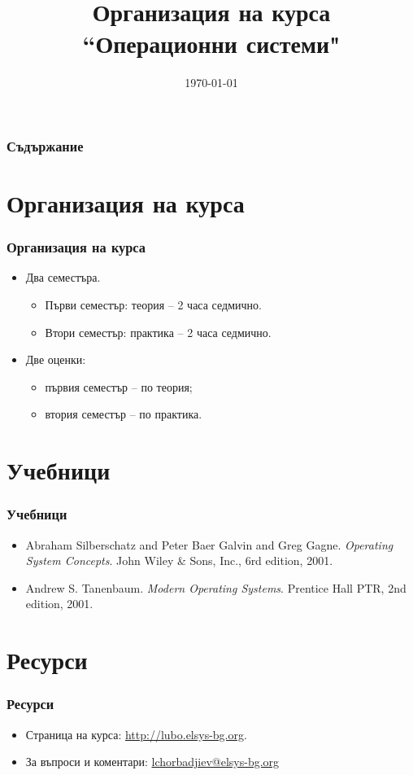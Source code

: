 \documentclass[ignorenonframetext, hyperref=unicode]{beamer}
\title{Организация на курса \\ ``Операционни системи"} \lubo
\date{\today}
\begin{document}
\frame{\maketitle}

\begin{frame}
\frametitle{Съдържание}
\tableofcontents %
\end{frame}

\section{Организация на курса}

\begin{frame}
\frametitle{Организация на курса}
\begin{itemize}
\item Два семестъра.
\begin{itemize}
  \item Първи семестър: теория -- 2 часа седмично.
  \item Втори семестър: практика -- 2 часа седмично.
\end{itemize}
\item Две оценки:
\begin{itemize}
  \item първия семестър -- по теория;
  \item втория семестър -- по практика.
\end{itemize}
\end{itemize}
\end{frame}

\section{Учебници}
\begin{frame}
\frametitle{Учебници}

\begin{itemize}
\item 
Abraham Silberschatz and Peter Baer Galvin and Greg Gagne.
{\em Operating System Concepts}.
{John Wiley \& Sons, Inc., 6rd edition, 2001.}
\item 
Andrew S. Tanenbaum.
{\em Modern Operating Systems}.
{Prentice Hall PTR, 2nd edition, 2001.}
\end{itemize}

\end{frame}

\section{Ресурси}
\begin{frame}
\frametitle{Ресурси}
\begin{itemize}
\item Страница на курса: \url{http://lubo.elsys-bg.org}.
\item За въпроси и коментари: \url{lchorbadjiev@elsys-bg.org}
\end{itemize}
\end{frame}
\end{document}
